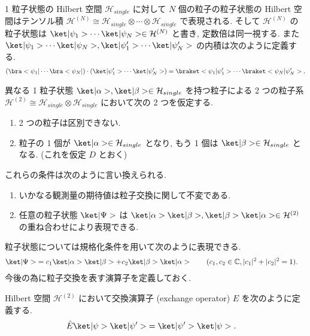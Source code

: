 \documentclass[uplatex,dvipdfmx,a4paper,11pt]{jlreq}
\newcommand{\CC}{\mathbb{C}}
\newcommand{\HH}{\mathcal{H}}
\numberwithin{equation}{section}
\theoremstyle{definition}
\begin{document}
\begin{definition}
  1 粒子状態の Hilbert 空間 $\HH_{single}$ に対して $N$ 個の粒子の粒子状態の Hilbert 空間はテンソル積 $\HH^{(N)}\cong\HH_{single}\otimes\cdots\otimes\HH_{single}$ で表現される.
  そして $\HH^{(N)}$ の粒子状態は $\ket|\psi_1>\cdots\ket|\psi_N> \in\HH^{(N)}$ と書き, 定数倍は同一視する.
  また $\ket|\psi_1>\cdots\ket|\psi_N>, \ket|\psi_1'>\cdots\ket|\psi_N'>$ の内積は次のように定義する.
  \begin{align}
    (\bra<\psi_1|\cdots\bra<\psi_N|)\cdot(\ket|\psi_1'>\cdots\ket|\psi_N'>) = \braket<\psi_1|\psi_1'>\cdots\braket<\psi_N|\psi_N'>.
  \end{align}
\end{definition}
異なる 1 粒子状態 $\ket|\alpha>,\ket|\beta>\in\HH_{single}$ を持つ粒子による 2 つの粒子系 $\HH^{(2)} \cong \HH_{single}\otimes\HH_{single}$ において次の 2 つを仮定する.

\begin{enumerate}
  \item 2 つの粒子は区別できない.
  \item 粒子の 1 個が $\ket|\alpha>\in\HH_{single}$ となり, もう 1 個は $\ket|\beta>\in\HH_{single}$ となる. (これを仮定 $D$ とおく)
\end{enumerate}
これらの条件は次のように言い換えられる.
\begin{enumerate}
  \item いかなる観測量の期待値は粒子交換に関して不変である.
  \item 任意の粒子状態 $\ket|\Psi>$ は $\ket|\alpha>\ket|\beta>, \ket|\beta>\ket|\alpha>\in\HH^{(2)}$ の重ね合わせにより表現できる.
\end{enumerate}
粒子状態については規格化条件を用いて次のように表現できる.
\begin{align}
  \ket|\Psi> & = c_1\ket|\alpha>\ket|\beta> + c_2\ket|\beta>\ket|\alpha> \qquad (c_1, c_2\in\CC, |c_1|^2 + |c_2|^2 = 1).
\end{align}
今後の為に粒子交換を表す演算子を定義しておく.
\begin{definition}[交換演算子]
  Hilbert 空間 $\HH^{(2)}$ において交換演算子 (exchange operator) $\hat{E}$ を次のように定義する.
  \begin{align}
    \hat{E}\ket|\psi>\ket|\psi'> & = \ket|\psi'>\ket|\psi>.
  \end{align}
\end{definition}
\end{document}
